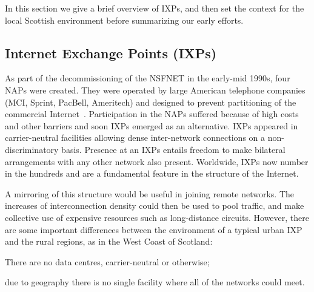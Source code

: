 In this section we give a brief overview of \acp{IXP}, and then set the context for the local Scottish environment before summarizing our early efforts.

\subsection{Internet Exchange Points (IXPs)}

As part of the decommissioning of the \ac{NSFNET} in the early-mid
1990s, four \acp{NAP} were created. They were operated by large
American telephone companies (MCI, Sprint, PacBell, Ameritech) and
designed to prevent partitioning of the commercial
Internet~\cite{hayes1997computing,Ager:2012}. Participation in
the \acp{NAP} suffered because of high costs and other barriers and
soon \acp{IXP} emerged as an alternative. \acp{IXP} appeared in
carrier-neutral facilities allowing dense inter-network connections on
a non-discriminatory basis. Presence at an \acp{IXP} entails freedom
to make bilateral arrangements with any other network also
present. Worldwide, \acp{IXP} now number in the hundreds and are a
fundamental feature in the structure of the Internet.



A mirroring of this structure would be useful in joining remote
networks. The increases of interconnection density could then
be used to pool traffic, and make collective use of expensive resources
such as long-distance circuits. However, there are some important
differences between the environment of a typical urban \ac{IXP} and
the rural regions, as in the West Coast of Scotland:
\begin{inparaenum}[(i)]
  \item There are no data centres, carrier-neutral or otherwise;
  \item due to geography there is no single facility where all of the
    networks could meet.
\end{inparaenum}


